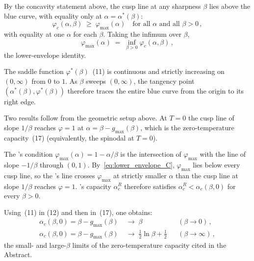 \documentclass[letterpaper]{article} %
\newcommand{\Bnet}{\beta}
\newcommand{\ac}{\alpha_c}
\begin{document}
By the concavity statement above, the cusp line at any sharpness $\Bnet$ lies above the blue curve, with equality only at
$\alpha = \alpha^*(\Bnet)$:
\begin{equation}
\varphi_c(\alpha, \Bnet) \;\ge\; \varphi_{\max}(\alpha) \quad \text{for all $\alpha$ and all $\Bnet > 0$}\,,
\tag{49}
\end{equation}
with equality at one $\alpha$ for each $\Bnet$. Taking the infimum over $\Bnet$,
\begin{equation}
\varphi_{\max}(\alpha) \;=\; \inf_{\Bnet > 0} \varphi_c(\alpha, \Bnet)\,,
\tag{50}
\label{eq:lower_envelope_C}
\end{equation}
the lower-envelope identity.

The saddle function $\varphi^*(\Bnet)$~(11) is continuous and strictly increasing on $(0, \infty)$ from $0$ to $1$. As $\Bnet$ sweeps $(0, \infty)$,
the tangency point $(\alpha^*(\Bnet), \varphi^*(\Bnet))$ therefore traces the entire blue curve from the origin to its right edge.

Two results follow from the geometric setup above.  At $T = 0$ the
cusp line of slope $1/\Bnet$ reaches $\varphi = 1$ at
$\alpha = \Bnet - g_{\max}(\Bnet)$, which is the zero-temperature
capacity~(17) (equivalently, the spinodal at
$T = 0$).

The \citeauthor{ramsauer2021hopfield}'s condition
$\varphi_{\max}(\alpha) = 1 - \alpha/\Bnet$ is the intersection of
$\varphi_{\max}$ with the line of slope $-1/\Bnet$ through $(0, 1)$.
By~\eqref{eq:lower_envelope_C}, $\varphi_{\max}$ lies below every
cusp line, so the \citeauthor{ramsauer2021hopfield}'s line crosses $\varphi_{\max}$ at strictly
smaller $\alpha$ than the cusp line at slope $1/\Bnet$ reaches
$\varphi = 1$.  \citeauthor{ramsauer2021hopfield}'s capacity $\alpha_c^R$ therefore satisfies
$\alpha_c^R < \alpha_c(\Bnet, 0)$ for every $\Bnet > 0$.

Using~(11) in
(12) and then in~(17), one obtains:
\begin{equation}
\begin{aligned}
\ac(\Bnet, 0) = \Bnet - g_{\max}(\Bnet) &\;\to\; \Bnet
   && (\Bnet \to 0)\,,\\
\ac(\Bnet, 0) = \Bnet - g_{\max}(\Bnet) &\;\to\; \tfrac{1}{2}\ln\Bnet + \tfrac{1}{2}
   && (\Bnet \to \infty)\,,
\end{aligned}
\tag{51}
\label{eq:asymptotic_C}
\end{equation}
the small- and large-$\Bnet$ limits of the zero-temperature capacity
cited in the Abstract.
\end{document}
